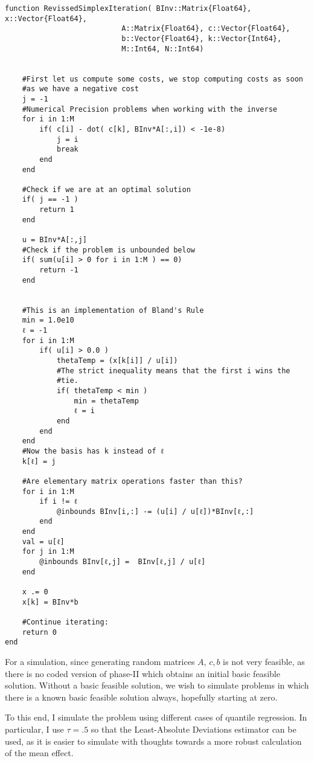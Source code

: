 \documentclass[12pt]{paper}
\begin{document}
\begin{verbatim}  
function RevissedSimplexIteration( BInv::Matrix{Float64}, x::Vector{Float64},
                           A::Matrix{Float64}, c::Vector{Float64},
                           b::Vector{Float64}, k::Vector{Int64},
                           M::Int64, N::Int64)


    #First let us compute some costs, we stop computing costs as soon
    #as we have a negative cost
    j = -1
    #Numerical Precision problems when working with the inverse
    for i in 1:M
        if( c[i] - dot( c[k], BInv*A[:,i]) < -1e-8)
            j = i
            break
        end
    end
   
    #Check if we are at an optimal solution
    if( j == -1 )
        return 1
    end
    
    u = BInv*A[:,j]
    #Check if the problem is unbounded below
    if( sum(u[i] > 0 for i in 1:M ) == 0)
        return -1
    end
    

    #This is an implementation of Bland's Rule
    min = 1.0e10
    ℓ = -1
    for i in 1:M
        if( u[i] > 0.0 )
            thetaTemp = (x[k[i]] / u[i])
            #The strict inequality means that the first i wins the
            #tie.
            if( thetaTemp < min )
                min = thetaTemp
                ℓ = i
            end
        end
    end
    #Now the basis has k instead of ℓ
    k[ℓ] = j

    #Are elementary matrix operations faster than this?
    for i in 1:M
        if i != ℓ
            @inbounds BInv[i,:] -= (u[i] / u[ℓ])*BInv[ℓ,:]
        end
    end
    val = u[ℓ]
    for j in 1:M
        @inbounds BInv[ℓ,j] =  BInv[ℓ,j] / u[ℓ]
    end
    
    x .= 0
    x[k] = BInv*b
    
    #Continue iterating:
    return 0
end

\end{verbatim}


For a simulation, since generating random matrices $A$, $c,b$ is not
very feasible, as there is no coded version of phase-II which obtains
an initial basic feasible solution. Without a basic feasible solution,
we wish to simulate problems in which there is a known basic feasible
solution always, hopefully starting at zero.

To this end, I simulate the problem using different cases of quantile
regression. In particular, I use $\tau = .5$ so that the Least-Absolute
Deviations estimator can be used, as it is easier to simulate with
thoughts towards a more robust calculation of the mean effect.
\end{document}
